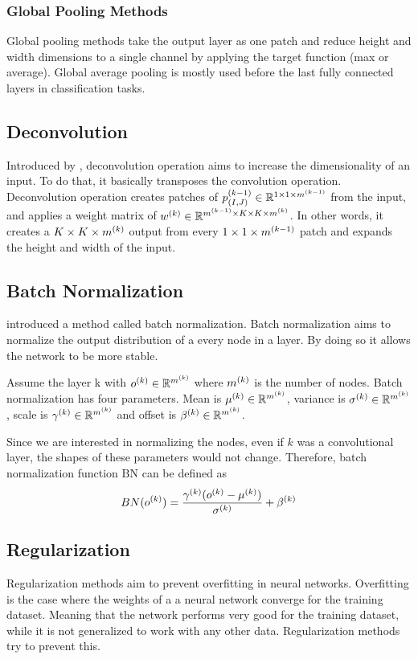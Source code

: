 \subsubsection{Global Pooling Methods}
Global pooling methods take the output layer as one patch and reduce height and width dimensions to a single channel by applying the target function (max or average). Global average pooling is mostly used before the last fully connected layers in classification tasks.

\subsection{Deconvolution}
Introduced by \cite{zeiler2010deconvolutional}, deconvolution operation aims to increase the dimensionality of an input. To do that, it basically transposes the convolution operation. Deconvolution operation creates patches of $p^{(k-1)}_{(I,J)} \in \mathbb{R}^{1 \times 1 \times m^{(k-1)}}$ from the input, and applies a weight matrix of $w^{(k)} \in \mathbb{R}^{m^{(k-1)} \times K \times K \times m^{(k)}}$. In other words, it creates a $K \times K \times m^{(k)}$ output from every $1 \times 1 \times m^{(k-1)}$ patch and expands the height and width of the input. 

\subsection{Batch Normalization}
\cite{ioffe2015batch} introduced a method called batch normalization. Batch normalization aims to normalize the output distribution of a every node in a layer. By doing so it allows the network to be more stable. 

Assume the layer k with $o^{(k)} \in \mathbb{R}^{m^{(k)}}$ where $m^{(k)}$ is the number of nodes. Batch normalization has four parameters. Mean is $\mu^{(k)} \in \mathbb{R}^{m^{(k)}}$, variance is $\sigma^{(k)} \in \mathbb{R}^{m^{(k)}}$, scale is $\gamma^{(k)} \in \mathbb{R}^{m^{(k)}}$ and offset is $\beta^{(k)} \in \mathbb{R}^{m^{(k)}}$. 

Since we are interested in normalizing the nodes, even if $k$ was a convolutional layer, the shapes of these parameters would not change. Therefore, batch normalization function $\textrm{BN}$ can be defined as 
$$ BN(o^{(k)}) = \frac{\gamma^{(k)}(o^{(k)}-\mu^{(k)})}{\sigma^{(k)}}+\beta^{(k)} $$

\subsection{Regularization}
Regularization methods aim to prevent overfitting in neural networks. Overfitting is the case where the weights of a a neural network converge for the training dataset. Meaning that the network performs very good for the training dataset, while it is not generalized to work with any other data. Regularization methods try to prevent this.


